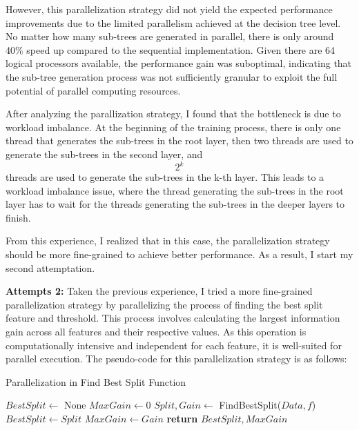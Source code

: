 \documentclass[13pt]{article}
\begin{document}
However, this parallelization strategy did not yield the expected performance improvements due to the limited parallelism achieved at the decision tree level. 
No matter how many sub-trees are generated in parallel, there is only around 40\% speed up compared to the sequential implementation.
Given there are 64 logical processors available, the performance gain was suboptimal, indicating that the sub-tree generation process was not sufficiently granular to exploit the full potential of parallel computing resources.

After analyzing the parallization strategy, I found that the bottleneck is due to workload imbalance.
At the beginning of the training process, there is only one thread that generates the sub-trees in the root layer, then two threads are used to generate the sub-trees in the second layer, and $$2^{k}$$ threads are used to generate the sub-trees in the k-th layer.
This leads to a workload imbalance issue, where the thread generating the sub-trees in the root layer has to wait for the threads generating the sub-trees in the deeper layers to finish.

From this experience, I realized that in this case, the parallelization strategy should be more fine-grained to achieve better performance.
As a result, I start my second attemptation.

\textbf{Attempts 2: }
Taken the previous experience, I tried a more fine-grained parallelization strategy by parallelizing the process of finding the best split feature and threshold.
This process involves calculating the largest information gain across all features and their respective values. As this operation is computationally intensive and independent for each feature, it is well-suited for parallel execution.
The pseudo-code for this parallelization strategy is as follows:

\begin{algorithm}[ht]
    \caption{Parallelization in Find Best Split Function}\label{alg:split}
    \begin{algorithmic}[1]
        \State $BestSplit \gets$ None
        \State $MaxGain \gets 0$
            \State \color{red} $Split, Gain \gets$ FindBestSplit($Data, f$) \color{black}
                \State $BestSplit \gets Split$
                \State $MaxGain \gets Gain$
            \EndIf
        \EndFor
        \State \textbf{return} $BestSplit, MaxGain$
    \EndProcedure
    \end{algorithmic}
\end{algorithm}
\end{document}
